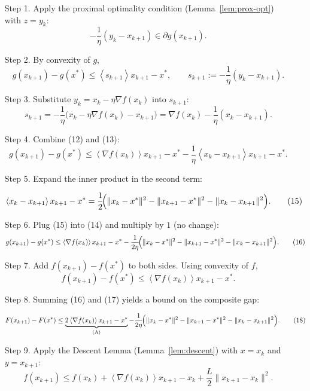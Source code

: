 \documentclass{article}
\newcommand{\inner}[1]{\left\langle #1\right\rangle}
\begin{document}
\begin{enumerate}
\item[Step 1.] Apply the proximal optimality condition (Lemma~\ref{lem:prox-opt}) with $z=y_{k}$:
\[
-\frac{1}{\eta}(y_{k}-x_{k+1})\in\partial g(x_{k+1}).
\tag{11}
\]

\item[Step 2.] By convexity of $g$,
\[
g(x_{k+1})-g(x^{*})\le \inner{s_{k+1}}{x_{k+1}-x^{*}},
\qquad s_{k+1}:=-\frac{1}{\eta}(y_{k}-x_{k+1}).
\tag{12}
\]

\item[Step 3.] Substitute $y_{k}=x_{k}-\eta\nabla f(x_{k})$ into $s_{k+1}$:
\[
s_{k+1}= -\frac{1}{\eta}\bigl(x_{k}-\eta\nabla f(x_{k})-x_{k+1}\bigr)
          =\nabla f(x_{k})-\frac{1}{\eta}(x_{k}-x_{k+1}).
\tag{13}
\]

\item[Step 4.] Combine (12) and (13):
\[
g(x_{k+1})-g(x^{*})\le 
\inner{\nabla f(x_{k})}{x_{k+1}-x^{*}}
-\frac{1}{\eta}\inner{x_{k}-x_{k+1}}{x_{k+1}-x^{*}}.
\tag{14}
\]

\item[Step 5.] Expand the inner product in the second term:

\[
\inner{x_{k}-x_{k+1}}{x_{k+1}-x^{*}}
= \frac12\!\Bigl(\|x_{k}-x^{*}\|^{2}-\|x_{k+1}-x^{*}\|^{2}-\|x_{k}-x_{k+1}\|^{2}\Bigr).
\tag{15}
\]

\item[Step 6.] Plug (15) into (14) and multiply by $1$ (no change):
\[
g(x_{k+1})-g(x^{*})\le
\inner{\nabla f(x_{k})}{x_{k+1}-x^{*}}
-\frac{1}{2\eta}\!\Bigl(\|x_{k}-x^{*}\|^{2}-\|x_{k+1}-x^{*}\|^{2}
-\|x_{k}-x_{k+1}\|^{2}\Bigr).
\tag{16}
\]

\item[Step 7.] Add $f(x_{k+1})-f(x^{*})$ to both sides.  Using convexity of $f$,
\[
f(x_{k+1})-f(x^{*})\le
\inner{\nabla f(x_{k})}{x_{k+1}-x^{*}} .
\tag{17}
\]

\item[Step 8.] Summing (16) and (17) yields a bound on the composite gap:

\[
F(x_{k+1})-F(x^{*})
\le
\underbrace{2\inner{\nabla f(x_{k})}{x_{k+1}-x^{*}}}_{\text{(A)}}
-\frac{1}{2\eta}\!\Bigl(\|x_{k}-x^{*}\|^{2}-\|x_{k+1}-x^{*}\|^{2}
-\|x_{k}-x_{k+1}\|^{2}\Bigr).
\tag{18}
\]

\item[Step 9.] Apply the Descent Lemma (Lemma~\ref{lem:descent}) with $x=x_{k}$ and $y=x_{k+1}$:
\[
f(x_{k+1})\le f(x_{k})+\inner{\nabla f(x_{k})}{x_{k+1}-x_{k}}
+\frac{L}{2}\|x_{k+1}-x_{k}\|^{2}.
\tag{19}
\]


\end{enumerate}
\end{document}
